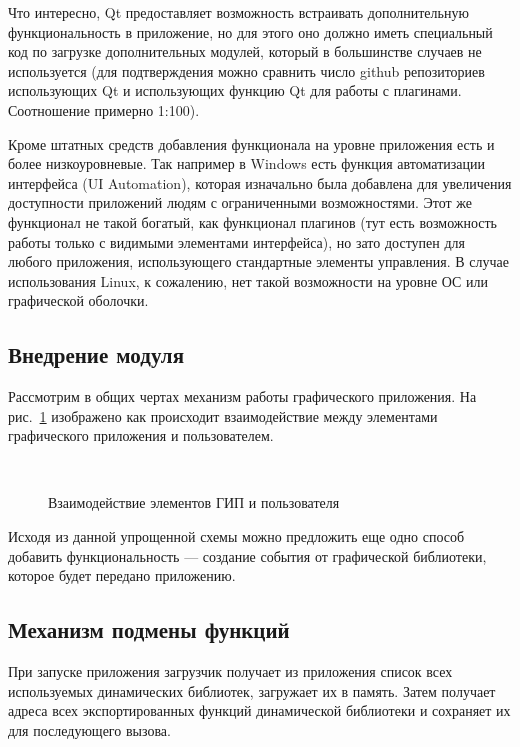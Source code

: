 Что интересно, Qt предоставляет возможность встраивать дополнительную
функциональность в приложение, но для этого оно должно иметь специальный код по
загрузке дополнительных модулей, который в большинстве случаев не используется
(для подтверждения можно сравнить число github репозиториев использующих
Qt\cite{githubqt} и использующих функцию Qt для работы с
плагинами\cite{githubqpluginloader}. Соотношение примерно 1:100).

Кроме штатных средств добавления функционала на уровне приложения есть и более
низкоуровневые. Так например в Windows есть функция автоматизации
интерфейса (UI Automation)\cite{windowsuiautomation}, которая изначально была
добавлена для увеличения доступности приложений людям с ограниченными
возможностями. Этот же функционал не такой богатый, как функционал плагинов
(тут есть возможность работы только с видимыми элементами интерфейса), но зато
доступен для любого приложения, использующего стандартные элементы управления.
В случае использования Linux, к сожалению, нет такой возможности на уровне ОС
или графической оболочки.

\subsection{Внедрение модуля}

Рассмотрим в общих чертах механизм работы графического приложения. На
рис.~\ref{fig:gui} изображено как происходит взаимодействие между элементами
графического приложения и пользователем.

\begin{figure}
	\centering
	\\
	\caption{Взаимодействие элементов ГИП и пользователя}\label{fig:gui}
\end{figure}

Исходя из данной упрощенной схемы можно предложить еще одно способ добавить
функциональность — создание события от графической библиотеки, которое будет
передано приложению.

\subsection{Механизм подмены функций}

При запуске приложения загрузчик получает из приложения список всех используемых
динамических библиотек, загружает их в память. Затем получает адреса всех
экспортированных функций динамической библиотеки и сохраняет их для последующего
вызова.

